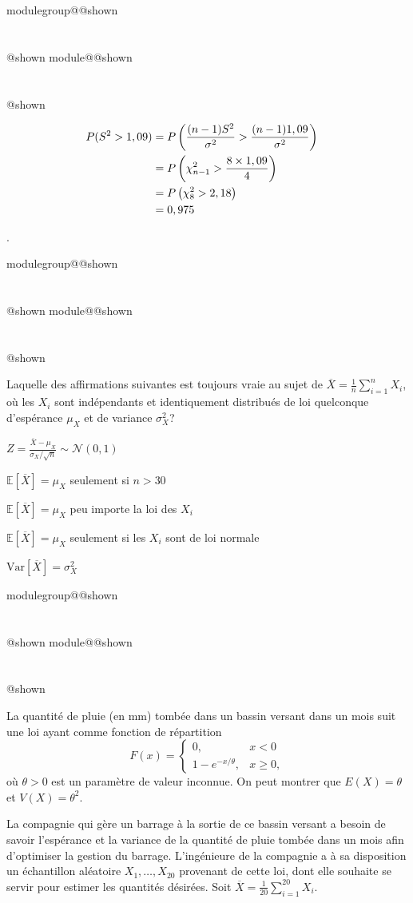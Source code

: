 \documentclass{Evaluation}
\makeatletter
\newcommand{\currentmodulekey}{}
\newcommand{\currentmoduletitle}{}
\newcommand{\currentgroupkey}{}
\newcommand{\currentgrouptitle}{}
\newcommand{\showmoduleifneeded}{%
  \ifx\currentgroupkey\empty\else
    \expandafter\ifx\csname modulegroup@\currentgroupkey @shown\endcsname\relax
      \section*{\currentgrouptitle}%
      \expandafter\gdef\csname modulegroup@\currentgroupkey @shown\endcsname{1}%
    \fi
  \fi
  \expandafter\ifx\csname module@\currentmodulekey @shown\endcsname\relax
    \section*{\currentmoduletitle}%
    \expandafter\gdef\csname module@\currentmodulekey @shown\endcsname{1}%
  \fi
}
\newenvironment{A23}{\showmoduleifneeded}{}
\newenvironment{A25}{\showmoduleifneeded}{}
\makeatother
\begin{document}
\begin{questions}
\begin{A23}
\begin{parts}
        \begin{solution}
        \begin{align*}
            P(S^2 > 1,09)
             &= P\left(\frac{(n-1)S^2}{\sigma^2}  > \frac{(n-1)1,09}{\sigma^2}\right) \cr
             &= P\left( \chi_{n-1}^2  > \frac{8\times 1,09}{4}\right) \cr
             &= P\left( \chi_{8}^2  > 2,18 \right) \cr
             &= 0,975
        \end{align*}
    \end{solution}
\end{parts}

.
\end{A23}

\begin{A23}
\question {} %
Laquelle des affirmations suivantes est toujours vraie au sujet de $\overline{X}=\displaystyle \frac{1}{n}\sum_{i=1}^n X_i$, où les $X_i$ sont indépendants et identiquement distribués de loi quelconque d'espérance $\mu_X$ et de variance $\sigma^2_X$? %

\begin{checkboxes}
\choice $\displaystyle Z=\frac{\overline{X}-\mu_X}{\sigma_X / \sqrt{n}}\sim \mathcal{N}(0, 1)$

\choice $\mathbb{E}\left[\overline{X}\right]=\mu_X$ seulement si $n>30$

\correctchoice $\mathbb{E}\left[\overline{X}\right]=\mu_X$ peu importe la loi des $X_i$

\choice $\displaystyle\mathbb{E}\left[\overline{X}\right]=\mu_X$  seulement si les $X_i$ sont de loi normale

\choice $\text{Var}\left[\overline{X}\right]=\sigma^2_X$
\end{checkboxes}
\end{A23}

\begin{A25}
\question {} %
La quantité de pluie (en mm) tombée dans un bassin versant
dans un mois suit une loi ayant comme fonction de répartition
$$F(x)=\left\{\begin{array}{ll}
0, & x<0\\
1-e^{-x/\theta}, & x\ge 0,
\end{array}\right.$$
où $\theta>0$ est un paramètre de valeur inconnue. On peut montrer que $E(X)=\theta$ et $V(X)=\theta^2$.

La compagnie qui gère un barrage à la sortie de ce bassin versant a besoin de savoir l'espérance et la variance de la quantité de pluie tombée
dans un mois afin d'optimiser la gestion du barrage. L'ingénieure de la compagnie a à sa disposition un échantillon aléatoire $X_1,\dots,X_{20}$
provenant de cette loi, dont elle souhaite se servir pour estimer les quantités désirées. Soit $\displaystyle \overline{X}=\frac{1}{20}\sum_{i=1}^{20}X_i$.


\end{A25}
\end{questions}
\end{document}
